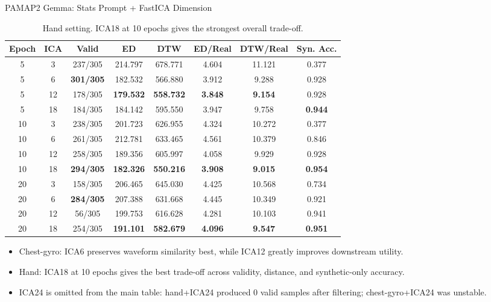 \begin{frame}{PAMAP2 Gemma: Stats Prompt + FastICA Dimension}
\vspace{-0.4em}
\begin{table}
\centering
\caption{Hand setting. ICA18 at 10 epochs gives the strongest overall trade-off.}
\begin{tabular}{cccccccc}
\toprule
Epoch & ICA & Valid & ED & DTW & ED/Real & DTW/Real & Syn. Acc. \\
\midrule
5  & 3  & 237/305 & 214.797 & 678.771 & 4.604 & 11.121 & 0.377 \\
5  & 6  & \textbf{301/305} & 182.532 & 566.880 & 3.912 & 9.288 & 0.928 \\
5  & 12 & 178/305 & \textbf{179.532} & \textbf{558.732} & \textbf{3.848} & \textbf{9.154} & 0.928 \\
5  & 18 & 184/305 & 184.142 & 595.550 & 3.947 & 9.758 & \textbf{0.944} \\
\midrule
10 & 3  & 238/305 & 201.723 & 626.955 & 4.324 & 10.272 & 0.377 \\
10 & 6  & 261/305 & 212.781 & 633.465 & 4.561 & 10.379 & 0.846 \\
10 & 12 & 258/305 & 189.356 & 605.997 & 4.058 & 9.929 & 0.928 \\
10 & 18 & \textbf{294/305} & \textbf{182.326} & \textbf{550.216} & \textbf{3.908} & \textbf{9.015} & \textbf{0.954} \\
\midrule
20 & 3  & 158/305 & 206.465 & 645.030 & 4.425 & 10.568 & 0.734 \\
20 & 6  & \textbf{284/305} & 207.388 & 631.668 & 4.445 & 10.349 & 0.921 \\
20 & 12 & 56/305 & 199.753 & 616.628 & 4.281 & 10.103 & 0.941 \\
20 & 18 & 254/305 & \textbf{191.101} & \textbf{582.679} & \textbf{4.096} & \textbf{9.547} & \textbf{0.951} \\
\bottomrule
\end{tabular}
\end{table}

\vspace{-0.3em}
\begin{itemize}
\item Chest-gyro: ICA6 preserves waveform similarity best, while ICA12 greatly improves downstream utility.
\item Hand: ICA18 at 10 epochs gives the best trade-off across validity, distance, and synthetic-only accuracy.
\item ICA24 is omitted from the main table: hand+ICA24 produced 0 valid samples after filtering; chest-gyro+ICA24 was unstable.
\end{itemize}
\end{frame}
